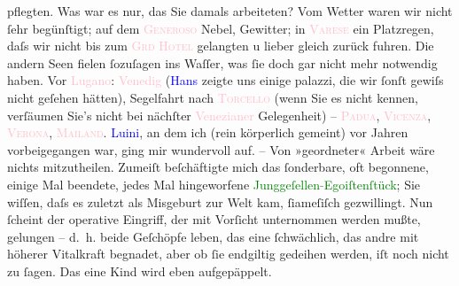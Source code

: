                     pflegten. Was war es nur, das Sie damals arbeiteten? Vom Wetter waren wir nicht
                    ſehr begünſtigt; auf dem \textsc{\textcolor{pink}{Generoso}{}\ledrightnote{\textcolor{pink}{Monte Generoso}}} Nebel, Gewitter; in \textsc{\textcolor{pink}{Varese}{}\ledrightnote{\textcolor{pink}{Varese}}} ein Platzregen, daſs wir nicht \introOben{}bis\introOben{} zum \textsc{\textcolor{pink}{Grd Hotel}{}\ledrightnote{\textcolor{pink}{Grand Hotel Varese}}} gelangten u lieber gleich zurück fuhren. Die andern Seen fielen ſozuſagen
                    ins Waſſer, was ſie doch gar nicht mehr notwendig haben. Vor \textcolor{pink}{Lugano}{}\ledrightnote{\textcolor{pink}{Lugano}}: \textcolor{pink}{Venedig}{}\ledrightnote{\textcolor{pink}{Venedig}} (\textcolor{blue}{Hans}{}\ledrightnote{\textcolor{blue}{Hans Bernhard Schlesinger}} zeigte uns einige {\pb}palazzi, die wir ſonſt gewiſs nicht geſehen
                    hätten), Segelfahrt nach \textsc{\textcolor{pink}{Torcello}{}\ledrightnote{\textcolor{pink}{Torcello}}} (wenn Sie es nicht kennen, verſäumen Sie’s nicht bei nächſter \textcolor{pink}{Venezianer}{}\ledrightnote{\textcolor{pink}{Ponte di Rialto}} Gelegenheit) – \textsc{\textcolor{pink}{Padua}{}\ledrightnote{\textcolor{pink}{Padua}}}, \textsc{\textcolor{pink}{Vicenza}{}\ledrightnote{\textcolor{pink}{Vicenza}}}, \textsc{\textcolor{pink}{Verona}{}\ledrightnote{\textcolor{pink}{Verona}}}, \textsc{\textcolor{pink}{Mailand}{}\ledrightnote{\textcolor{pink}{Mailand}}}. \textcolor{blue}{Luini}{}\ledrightnote{\textcolor{blue}{Bernardino Luini}}, an dem ich (rein körperlich
                    gemeint) vor Jahren vorbeigegangen war, ging mir wundervoll auf. –\pend
           \pstart
           Von »geordneter« Arbeit wäre nichts mitzutheilen. Zumeiſt beſchäftigte mich das
                    ſonderbare, {\pb}oft begonnene, einige Mal beendete,
                    jedes Mal hingeworfene \textcolor{green}{Junggeſellen\textcolor{gray}{-}Egoiſtenſtück}{}; Sie wiſſen, daſs es
                    zuletzt als Misgeburt zur Welt kam, ſiameſiſch gezwillingt. Nun ſcheint der
                    operative Eingriff, der mit Vorſicht unternommen werden mußte, gelungen – d. h.
                    beide Geſchöpfe leben, das eine ſchwächlich, das andre mit höherer Vitalkraft
                    begnadet, {\pb}aber ob ſie endgiltig gedeihen werden,
                    iſt noch nicht zu ſagen. Das eine Kind wird eben aufgepäppelt.\pend
